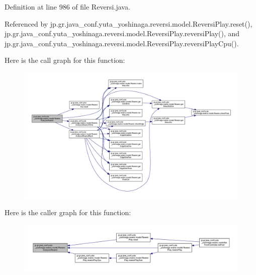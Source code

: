 Definition at line 986 of file Reversi.\+java.



Referenced by jp.\+gr.\+java\+\_\+conf.\+yuta\+\_\+yoshinaga.\+reversi.\+model.\+Reversi\+Play.\+reset(), jp.\+gr.\+java\+\_\+conf.\+yuta\+\_\+yoshinaga.\+reversi.\+model.\+Reversi\+Play.\+reversi\+Play(), and jp.\+gr.\+java\+\_\+conf.\+yuta\+\_\+yoshinaga.\+reversi.\+model.\+Reversi\+Play.\+reversi\+Play\+Cpu().

Here is the call graph for this function\+:
\nopagebreak
\begin{figure}[H]
\begin{center}
\leavevmode
\includegraphics[width=350pt]{classjp_1_1gr_1_1java__conf_1_1yuta__yoshinaga_1_1reversi_1_1model_1_1_reversi_a43098c043d0424bb5e5e60db358a324d_cgraph}
\end{center}
\end{figure}
Here is the caller graph for this function\+:
\nopagebreak
\begin{figure}[H]
\begin{center}
\leavevmode
\includegraphics[width=350pt]{classjp_1_1gr_1_1java__conf_1_1yuta__yoshinaga_1_1reversi_1_1model_1_1_reversi_a43098c043d0424bb5e5e60db358a324d_icgraph}
\end{center}
\end{figure}
\mbox{\label{classjp_1_1gr_1_1java__conf_1_1yuta__yoshinaga_1_1reversi_1_1model_1_1_reversi_adb74246f49150e02201766a1fa6cf732}} 
